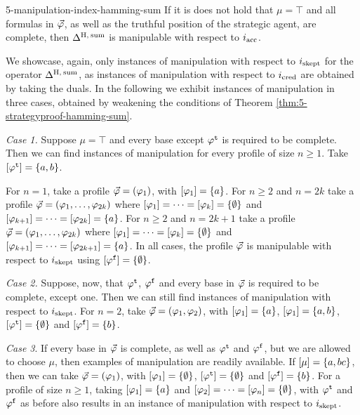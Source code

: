 \begin{prp}{}{5-manipulation-index-hamming-sum}
	If it is does not hold that $\mu=\top$ and all formulas in $\P$, 
	as well as the truthful position of the strategic agent, are complete,
	then $\me^{\hamming,\:\ssum}$ is manipulable with respect to $i_\acc$.
\end{prp}
\begin{prf*}{}{}%
	We showcase, again, only instances of manipulation with respect to $i_\skept$ 
	for the operator $\me^{\hamming,\:\ssum}$,
	as instances of manipulation with respect to $i_\cred$ are obtained by taking the duals.
	In the following we exhibit instances of manipulation in three cases,
	obtained by weakening the conditions of Theorem \ref{thm:5-strategyproof-hamming-sum}.
	
	\emph{Case 1.}
	Suppose $\mu=\top$ and every base except $\truth{\phi}$ is required to be complete.
	Then we can find instances of manipulation for every profile of size $n\geq 1$.
	Take $\mods{\truth{\phi}}=\set{a,b}$.
	
	For $n=1$, take a profile $\P=(\phi_1)$, with $\mods{\phi_1}=\set{a}$. 
	For $n\geq 2$ and $n=2k$ take a profile $\P=(\phi_1,\dots,\phi_{2k})$
	where $\mods{\phi_1}=\dots=\mods{\phi_k}=\set{\emptyset}$ and $\mods{\phi_{k+1}}=\dots=\mods{\phi_{2k}}=\set{a}$.
	For $n\geq 2$ and $n=2k+1$ take a profile $\P=(\phi_1,\dots,\phi_{2k})$
	where $\mods{\phi_1}=\dots=\mods{\phi_k}=\set{\emptyset}$ and $\mods{\phi_{k+1}}=\dots=\mods{\phi_{2k+1}}=\set{a}$.
	In all cases, the profile $\P$ is manipulable with respect to $i_\skept$
	using $\mods{\manip{\phi}}=\set{\emptyset}$.
	
	\emph{Case 2.}
	Suppose, now, that $\truth{\phi}$, $\manip{\phi}$ and every base in $\P$ is required to be complete,
	except one. Then we can still find instances of manipulation with respect to $i_\skept$.
	For $n=2$, take $\P=(\phi_1,\phi_2)$,
	with $\mods{\phi_1}=\set{a}$, $\mods{\phi_1}=\set{a,b}$, 
	$\mods{\truth{\phi}}=\set{\emptyset}$ and $\mods{\manip{\phi}}=\set{b}$.
	
	\emph{Case 3}.
	If every base in $\P$ is complete, 
	as well as $\truth{\phi}$ and $\manip{\phi}$, but we are allowed to choose $\mu$, then
	examples of manipulation are readily available.
	If $\mods{\mu}=\set{a,bc}$, then we can take $\P=(\phi_1)$,
	with $\mods{\phi_1}=\set{\emptyset}$, $\mods{\truth{\phi}}=\set{\emptyset}$ and $\mods{\manip{\phi}}=\set{b}$.
	For a profile of size $n\geq 1$, 
	taking $\mods{\phi_1}=\set{a}$ and $\mods{\phi_2}=\dots=\mods{\phi_n}=\set{\emptyset}$,
	with $\truth{\phi}$ and $\manip{\phi}$ as before also 
	results in an instance of manipulation with respect to $i_\skept$.
\end{prf*}




